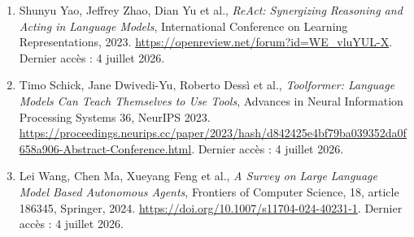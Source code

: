 \begin{enumerate}[resume]
  \item\label{web:react-yao} Shunyu Yao, Jeffrey Zhao, Dian Yu et al., \textit{ReAct: Synergizing Reasoning and Acting in Language Models}, International Conference on Learning Representations, 2023. \url{https://openreview.net/forum?id=WE_vluYUL-X}. Dernier accès : 4 juillet 2026.
  \item\label{web:toolformer} Timo Schick, Jane Dwivedi-Yu, Roberto Dessì et al., \textit{Toolformer: Language Models Can Teach Themselves to Use Tools}, Advances in Neural Information Processing Systems 36, NeurIPS 2023. \url{https://proceedings.neurips.cc/paper/2023/hash/d842425e4bf79ba039352da0f658a906-Abstract-Conference.html}. Dernier accès : 4 juillet 2026.
  \item\label{web:llm-agents-survey} Lei Wang, Chen Ma, Xueyang Feng et al., \textit{A Survey on Large Language Model Based Autonomous Agents}, Frontiers of Computer Science, 18, article 186345, Springer, 2024. \url{https://doi.org/10.1007/s11704-024-40231-1}. Dernier accès : 4 juillet 2026.
\end{enumerate}

\endgroup
